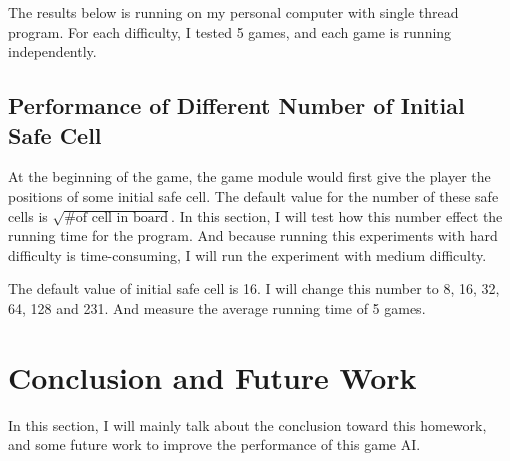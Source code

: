 \documentclass[twocolumn]{extarticle}
\begin{document}
The results below is running on my personal computer with single thread program. For each difficulty, I tested 5 games, and each game is running independently.

\subsection{Performance of Different Number of Initial Safe Cell}

At the beginning of the game, the game module would first give the player the positions of some initial safe cell. The default value for the number of these safe cells is $\sqrt{\text{\# of cell in board}}$. In this section, I will test how this number effect the running time for the program. And because running this experiments with hard difficulty is time-consuming, I will run the experiment with medium difficulty. 

The default value of initial safe cell is 16. I will change this number to 8, 16, 32, 64, 128 and 231. And measure the average running time of 5 games. 


\begin{table}[H]
\centering
\caption{The performance with different number of init safe cell. The parwise matching is the average number of running pairwise matching.}
\label{tab:safe}
\end{table}

\section{Conclusion and Future Work}

In this section, I will mainly talk about the conclusion toward this homework, and some future work to improve the performance of this game AI.
\end{document}
